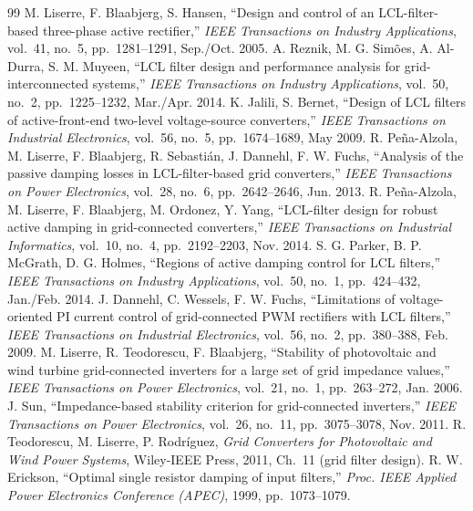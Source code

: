\documentclass[10pt,a4paper]{scrartcl}
\begin{document}
\begin{thebibliography}{99}\small
{} M. Liserre, F. Blaabjerg, S. Hansen, ``Design and control of an LCL-filter-based three-phase active rectifier,'' \emph{IEEE Transactions on Industry Applications}, vol.~41, no.~5, pp.~1281--1291, Sep./Oct. 2005.
 A. Reznik, M. G. Sim\~oes, A. Al-Durra, S. M. Muyeen, ``LCL filter design and performance analysis for grid-interconnected systems,'' \emph{IEEE Transactions on Industry Applications}, vol.~50, no.~2, pp.~1225--1232, Mar./Apr. 2014.
 K. Jalili, S. Bernet, ``Design of LCL filters of active-front-end two-level voltage-source converters,'' \emph{IEEE Transactions on Industrial Electronics}, vol.~56, no.~5, pp.~1674--1689, May 2009.
 R. Pe\~na-Alzola, M. Liserre, F. Blaabjerg, R. Sebasti\'an, J. Dannehl, F. W. Fuchs, ``Analysis of the passive damping losses in LCL-filter-based grid converters,'' \emph{IEEE Transactions on Power Electronics}, vol.~28, no.~6, pp.~2642--2646, Jun. 2013.
 R. Pe\~na-Alzola, M. Liserre, F. Blaabjerg, M. Ordonez, Y. Yang, ``LCL-filter design for robust active damping in grid-connected converters,'' \emph{IEEE Transactions on Industrial Informatics}, vol.~10, no.~4, pp.~2192--2203, Nov. 2014.
 S. G. Parker, B. P. McGrath, D. G. Holmes, ``Regions of active damping control for LCL filters,'' \emph{IEEE Transactions on Industry Applications}, vol.~50, no.~1, pp.~424--432, Jan./Feb. 2014.
 J. Dannehl, C. Wessels, F. W. Fuchs, ``Limitations of voltage-oriented PI current control of grid-connected PWM rectifiers with LCL filters,'' \emph{IEEE Transactions on Industrial Electronics}, vol.~56, no.~2, pp.~380--388, Feb. 2009.
 M. Liserre, R. Teodorescu, F. Blaabjerg, ``Stability of photovoltaic and wind turbine grid-connected inverters for a large set of grid impedance values,'' \emph{IEEE Transactions on Power Electronics}, vol.~21, no.~1, pp.~263--272, Jan. 2006.
 J. Sun, ``Impedance-based stability criterion for grid-connected inverters,'' \emph{IEEE Transactions on Power Electronics}, vol.~26, no.~11, pp.~3075--3078, Nov. 2011.
 R. Teodorescu, M. Liserre, P. Rodr\'iguez, \emph{Grid Converters for Photovoltaic and Wind Power Systems}, Wiley-IEEE Press, 2011, Ch.~11 (grid filter design).
 R. W. Erickson, ``Optimal single resistor damping of input filters,'' \emph{Proc. IEEE Applied Power Electronics Conference (APEC)}, 1999, pp.~1073--1079.

\end{thebibliography}
\end{document}
